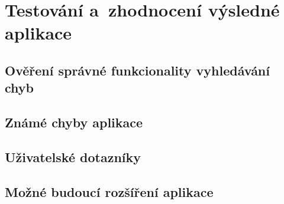 \dummyShortText[13]

\dummyText


\dummyShortText[8]


\dummyText






\chapter{Testování a~zhodnocení výsledné aplikace}

\dummyShortText[10]


\section{Ověření správné funkcionality vyhledávání chyb}


\section{Známé chyby aplikace}


\section{Uživatelské dotazníky}


\section{Možné budoucí rozšíření aplikace}






